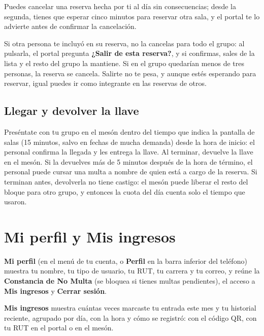 \documentclass[11pt,a4paper]{report}
\begin{document}
Puedes cancelar una reserva hecha por ti al día sin consecuencias; desde la
segunda, tienes que esperar cinco minutos para reservar otra sala, y el
portal te lo advierte antes de confirmar la cancelación.

Si otra persona te incluyó en su reserva, no la cancelas para todo el
grupo: al pulsarla, el portal pregunta \textbf{¿Salir de esta reserva?}, y
si confirmas, sales de la lista y el resto del grupo la mantiene. Si en el
grupo quedarían menos de tres personas, la reserva se cancela. Salirte no
te pesa, y aunque estés esperando para reservar, igual puedes ir como
integrante en las reservas de otros.

\section{Llegar y devolver la llave}

Preséntate con tu grupo en el mesón dentro del tiempo que indica la pantalla de
salas (15 minutos, salvo en fechas de mucha demanda) desde la hora
de inicio: el personal confirma la llegada y les entrega la llave. Al
terminar, devuelve la llave en el mesón. Si la devuelves más de 5 minutos
después de la hora de término, el personal puede cursar una multa a nombre
de quien está a cargo de la reserva. Si terminan antes, devolverla no tiene
castigo: el mesón puede liberar el resto del bloque para otro grupo, y
entonces la cuota del día cuenta solo el tiempo que usaron.

\chapter{Mi perfil y Mis ingresos}

\textbf{Mi perfil} (en el menú de tu cuenta, o \textbf{Perfil} en la barra
inferior del teléfono) muestra tu nombre, tu tipo de usuario, tu RUT, tu
carrera y tu correo, y reúne la \textbf{Constancia de No Multa} (se
bloquea si tienes multas pendientes), el acceso a \textbf{Mis ingresos} y
\textbf{Cerrar sesión}.

\textbf{Mis ingresos} muestra cuántas veces marcaste tu entrada este mes y
tu historial reciente, agrupado por día, con la hora y cómo se registró:
con el código QR, con tu RUT en el portal o en el mesón.

\end{document}
